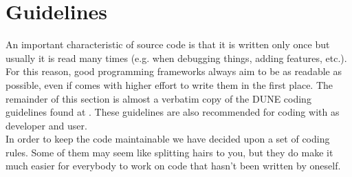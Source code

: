 \section{Guidelines} 
\label{guidelines}

An important characteristic of source code is that it is written only
once but usually it is read many times (e.g. when debugging things,
adding features, etc.). For this reason, good programming frameworks
always aim to be as readable as possible, even if comes with higher
effort to write them in the first place. The remainder of this section
is almost a verbatim copy of the DUNE coding guidelines found at
\cite{DUNE-HP}. These guidelines are also recommended for coding with
\Dumux as developer and user.
\\

In order to keep the code maintainable we have decided upon a set of
coding rules.  Some of them may seem like splitting hairs to you, but
they do make it much easier for everybody to work on code that hasn't
been written by oneself.


